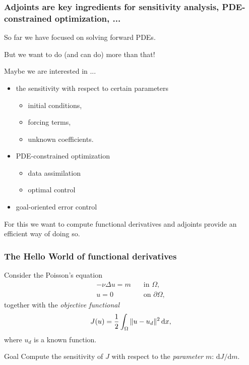 \begin{frame}
  \frametitle{Adjoints are key ingredients for sensitivity analysis,
    PDE-constrained optimization, ...}

  \vspace{1em}
  So far we have focused on solving forward PDEs.

  \bigskip

  But we want to do (and can do) more than that!

  \bigskip

  Maybe we are interested in ...
  \begin{itemize}
  \item
    the sensitivity with respect to certain parameters
    \begin{itemize}
    \item initial conditions,
    \item forcing terms,
    \item unknown coefficients.
    \end{itemize}
  \item
    PDE-constrained optimization
    \begin{itemize}
    \item
      data assimilation
    \item
      optimal control
    \end{itemize}
  \item
    goal-oriented error control
  \end{itemize}

  \bigskip

  For this we want to compute \alert{functional derivatives} and
  adjoints provide an efficient way of doing so.

\end{frame}

\small

\normalsize

\begin{frame}
    \frametitle{The Hello World of functional derivatives}
    Consider the Poisson's equation
    \begin{equation*}
        \begin{aligned}
            - \nu \Delta u = m \quad & \textrm{in } \Omega, \\
            u = 0 \quad & \textrm{on } \partial \Omega,
    \end{aligned}
    \end{equation*}
    together with the \emph{objective functional}
    \begin{equation*}
        J(u) = \frac{1}{2} \int_\Omega \|u - u_d\|^2 \, \mathrm{d}x,
    \end{equation*}
    where $u_d$ is a known function.

    \begin{block}{Goal}
        Compute the sensitivity of $J$ with respect to the \emph{parameter} $m$: $\textrm{d} J / \textrm{d}m$.
    \end{block}

\end{frame}

